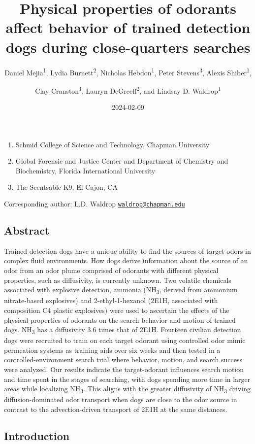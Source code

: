 \documentclass[
]{article}
\title{Physical properties of odorants affect behavior of trained detection dogs during close-quarters searches}
\author{Daniel Mejia\textsuperscript{1}, Lydia Burnett\textsuperscript{2}, Nicholas Hebdon\textsuperscript{1}, Peter Stevens\textsuperscript{3}, Alexis Shiber\textsuperscript{1}, \and Clay Cranston\textsuperscript{1}, Lauryn DeGreeff\textsuperscript{2}, and Lindsay D. Waldrop\textsuperscript{1}}
\date{2024-02-09}
\providecommand{\tightlist}{%
  \setlength{\itemsep}{0pt}\setlength{\parskip}{0pt}}
\begin{document}
\maketitle

\begin{enumerate}
\def\labelenumi{\arabic{enumi}.}
\tightlist
\item
  Schmid College of Science and Technology, Chapman University
\item
  Global Forensic and Justice Center and Department of Chemistry and Biochemistry, Florida International University
\item
  The Scentsable K9, El Cajon, CA
\end{enumerate}

Corresponding author: L.D. Waldrop \href{mailto:waldrop@chapman.edu}{\nolinkurl{waldrop@chapman.edu}}

\hypertarget{abstract}{%
\subsection{Abstract}\label{abstract}}

Trained detection dogs have a unique ability to find the sources of target odors in complex fluid environments. How dogs derive information about the source of an odor from an odor plume comprised of odorants with different physical properties, such as diffusivity, is currently unknown. Two volatile chemicals associated with explosive detection, ammonia (NH\textsubscript{3}, derived from ammonium nitrate-based explosives) and 2-ethyl-1-hexanol (2E1H, associated with composition C4 plastic explosives) were used to ascertain the effects of the physical properties of odorants on the search behavior and motion of trained dogs. NH\textsubscript{3} has a diffusivity 3.6 times that of 2E1H. Fourteen civilian detection dogs were recruited to train on each target odorant using controlled odor mimic permeation systems as training aids over six weeks and then tested in a controlled-environment search trial where behavior, motion, and search success were analyzed. Our results indicate the target-odorant influences search motion and time spent in the stages of searching, with dogs spending more time in larger areas while localizing NH\textsubscript{3}. This aligns with the greater diffusivity of NH\textsubscript{3} driving diffusion-dominated odor transport when dogs are close to the odor source in contrast to the advection-driven transport of 2E1H at the same distances.

\hypertarget{introduction}{%
\subsection{Introduction}\label{introduction}}
\end{document}
